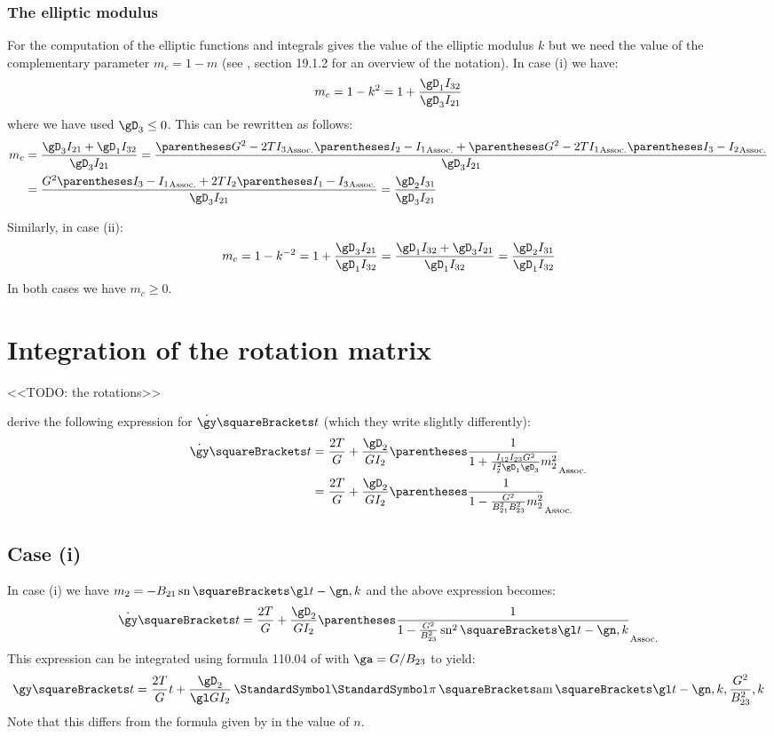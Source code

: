 \documentclass[10pt, a4paper, twoside]{basestyle}
\begin{document}
\subsubsection*{The elliptic modulus}
For the computation of the elliptic functions and integrals \cite{Celledoni2007} gives the value of the elliptic modulus $k$ but we need the value of
the complementary parameter $m_c = 1 - m$ (see \cite{NistHMF2010}, section 19.1.2 for an overview of the notation).  In case (i) we have:
\[
m_c = 1 - k^2 = 1 + \frac{\gD_1 I_{32}}{\gD_3 I_{21}}
\]
where we have used $\gD_3 \leq 0$.  This can be rewritten as follows:
\begin{align*}
m_c &= \frac{\gD_3 I_{21} + \gD_1 I_{32}}{\gD_3 I_{21}}
=\frac{\pa{G^2 - 2 T I_3}\pa{I_2 - I_1} + \pa{G^2 - 2 T I_1}\pa{I_3 - I_2}}{\gD_3 I_{21}} \\
&=\frac{G^2\pa{I_3 - I_1} + 2 T I_2\pa{I_1 - I_3}}{\gD_3 I_{21}}
=\frac{\gD_2 I_{31}}{\gD_3 I_{21}}
\end{align*}

Similarly, in case (ii):
\[
m_c = 1 - k^{-2} = 1 + \frac{\gD_3 I_{21}}{\gD_1 I_{32}}
=\frac{\gD_1 I_{32} + \gD_3 I_{21}}{\gD_1 I_{32}}
=\frac{\gD_2 I_{31}}{\gD_1 I_{32}}
\]
In both cases we have $m_c \geq 0$.

\section*{Integration of the rotation matrix}
<<TODO: the rotations>>

\cite{Celledoni2007} derive the following expression for $\TimeDerivative{\gy}\of{t}$ (which they write slightly differently):
\begin{align*}
\TimeDerivative{\gy}\of{t} &= \frac{2 T}{G} + \frac{\gD_2}{G I_2}\pa{\frac{1}{1 + \frac{I_{12}I_{23}G^2}{I_2^2 \gD_1 \gD_3}m_2^2}}\\
&= \frac{2 T}{G} + \frac{\gD_2}{G I_2}\pa{\frac{1}{1 - \frac{G^2}{B_{21}^2 B_{23}^2}m_2^2}}
\end{align*}

\subsection*{Case (i)}
In case (i) we have $m_2 = -B_{21} \JacobiSN\of{\gl t - \gn, k}$ and the above expression becomes:
\[
\TimeDerivative{\gy}\of{t} = \frac{2 T}{G} + \frac{\gD_2}{G I_2}\pa{\frac{1}{1 - \frac{G^2}{B_{23}^2}\JacobiSN^2\of{\gl t - \gn, k}}}
\]
This expression can be integrated using formula 110.04 of \cite{ByrdFriedman1954} with $\ga = G/B_{23}$ to yield:
\[
\gy\of{t} = \frac{2 T}{G}t + \frac{\gD_2}{\gl G I_2}\EllipticPi\of{\JacobiAmplitude\of{\gl t - \gn, k}, \frac{G^2}{B_{23}^2}, k}
\]
Note that this differs from the formula given by \cite{Celledoni2007} in the value of $n$.
\end{document}
